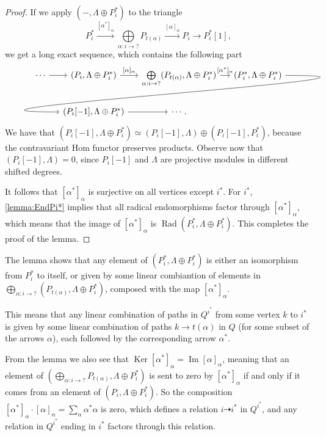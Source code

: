\documentclass[12pt, dvipsnames, oneside]{amsart}
\DeclareMathOperator{\Ker}{Ker}
\DeclareMathOperator{\Img}{Im}
\DeclareMathOperator{\Rad}{Rad}
\theoremstyle{definition}
\begin{document}
\begin{proof}
If we apply $(-,\Lambda \oplus P_i^*)$ to the triangle
\begin{equation*}
P_i^*\xrightarrow{[\alpha^*]_{\alpha}} \bigoplus\limits_{\alpha: i\rightarrow ?} P_{t(\alpha)} \xrightarrow{[\alpha]_{\alpha}} P_i \rightarrow P_i^*[1],
\end{equation*}
we get a long exact sequence, which contains the following part 
\begin{equation*}
\begin{tikzcd}[column sep = small]
\cdots \arrow[r] & (P_i,\Lambda \oplus P_i^*) \arrow[r, "{[\alpha]_{\alpha}}"] & \bigoplus\limits_{\alpha:i\rightarrow ?}(P_{t(\alpha)},\Lambda \oplus P_i^*) \arrow[r, "{[\alpha^*]_{\alpha}}"] & (P_i^*,\Lambda \oplus P_i^*) \arrow[dll, out = 0, in = 180, looseness=2, overlay] \\
& (P_i[-1], \Lambda \oplus P_i^*) \arrow[r] & \cdots. & 
\end{tikzcd}
\end{equation*}
We have that $(P_i[-1], \Lambda \oplus P_i^*)\simeq (P_i[-1], \Lambda)\oplus(P_i[-1], P_i^*)$, because the contravariant Hom functor preserves products. Observe now that
$(P_i[-1], \Lambda)=0$, since $P_i[-1]$ and $\Lambda$ are projective modules in different shifted degrees. 


It follows that $[\alpha^*]_\alpha$ is surjective on all vertices except $i^*$. For $i^*$, \cref{lemma:EndPi*} implies that all radical endomorphisms factor through $[\alpha^*]_\alpha$, which means that the image of $[\alpha^*]_\alpha$ is $\Rad(P_i^*,\Lambda\oplus P_i^*)$. This completes the proof of the lemma.

\end{proof}

The lemma shows that any element of $(P_i^*, \Lambda\oplus P_i^*)$ is either an isomorphism from $P_i^*$ to itself, or given by some linear combiantion of elements in $\bigoplus\limits_{\alpha:i\rightarrow ?}(P_{t(\alpha)},\Lambda\oplus P_i^*)$, composed with the map $[\alpha^*]_\alpha$. 

This means that any linear combination of paths in $Q^{i^*}$ from some vertex $k$ to $i^*$ is given by some linear combination of paths $k\rightarrow t(\alpha)$ in $Q$ (for some subset of the arrows $\alpha$), each followed by the corresponding arrow $\alpha^*$. 

From the lemma we also see that $\Ker[\alpha^*]_{\alpha} = \Img[\alpha]_\alpha$, meaning that an element of $(\bigoplus\limits_{\alpha: i\rightarrow ?} P_{t(\alpha)}, \Lambda \oplus P_i^*)$ is sent to zero by $[\alpha^*]_\alpha$ if and only if it comes from an element of $(P_i, \Lambda\oplus P_i^*)$. So the composition $[\alpha^*]_\alpha\cdot[\alpha]_\alpha=\sum_{\alpha}\alpha^*\alpha$ is zero, which defines a relation $i\dashrightarrow i^*$ in $Q^{i^*}$, and any relation in $Q^{i^*}$ ending in $i^*$ factors through this relation.
\end{document}
